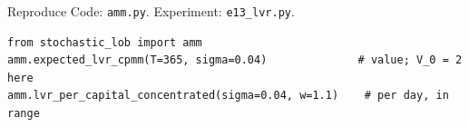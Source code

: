 \documentclass[aspectratio=169,10pt]{beamer}
\begin{document}
\begin{frame}[fragile]{Reproduce}
  \small
  Code: \texttt{amm.py}. Experiment: \texttt{e13\_lvr.py}.
\begin{verbatim}
from stochastic_lob import amm
amm.expected_lvr_cpmm(T=365, sigma=0.04)              # value; V_0 = 2 here
amm.lvr_per_capital_concentrated(sigma=0.04, w=1.1)    # per day, in range
\end{verbatim}
\end{frame}

\deckreferences
\end{document}
